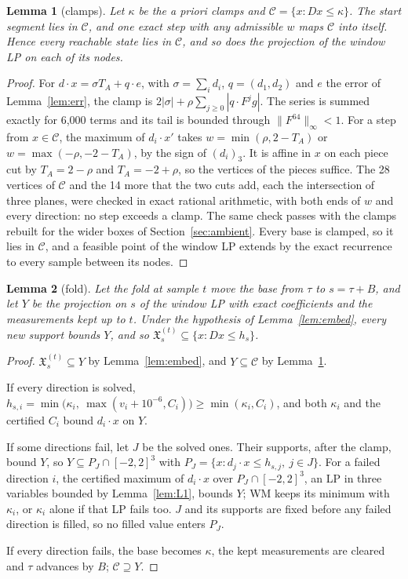 \documentclass[11pt,a4paper]{article}
\newtheorem{alemma}{Lemma}[section]
\begin{document}
\begin{alemma}[clamps]\label{lem:clamp}
Let $\kappa$ be the a priori clamps and $\mathcal{C} = \{x : Dx\le\kappa\}$. The start segment lies in $\mathcal{C}$,
and one exact step with any admissible $w$ maps $\mathcal{C}$ into itself. Hence every reachable state lies in
$\mathcal{C}$, and so does the projection of the window LP on each of its nodes.
\end{alemma}
\begin{proof}
For $d\cdot x = \sigma T_A + q\cdot e$, with $\sigma = \sum_i d_i$, $q = (d_1, d_2)$ and $e$ the error of
Lemma~\ref{lem:err}, the clamp is $2|\sigma| + \rho\sum_{j\ge0}|q\cdot F^j g|$. The series is summed exactly for 6,000
terms and its tail is bounded through $\|F^{64}\|_\infty<1$. For a step from $x\in\mathcal{C}$, the maximum of
$d_i\cdot x'$ takes $w = \min(\rho, 2 - T_A)$ or $w = \max(-\rho, -2 - T_A)$, by the sign of $(d_i)_3$. It is affine in
$x$ on each piece cut by $T_A = 2-\rho$ and $T_A = -2+\rho$, so the vertices of the pieces suffice. The 28 vertices of
$\mathcal{C}$ and the 14 more that the two cuts add, each the intersection of three planes, were checked in exact
rational arithmetic, with both ends
of $w$ and every direction: no step exceeds a clamp. The same check passes with the clamps rebuilt for the wider
boxes of Section~\ref{sec:ambient}. Every base is clamped, so it lies in $\mathcal{C}$, and a feasible
point of the window LP extends by the exact recurrence to every sample between its nodes.
\end{proof}

\begin{alemma}[fold]\label{lem:fold}
Let the fold at sample $t$ move the base from $\tau$ to $s = \tau + B$, and let $Y$ be the projection on $s$ of the
window LP with exact coefficients and the measurements kept up to $t$. Under the hypothesis of Lemma~\ref{lem:embed},
every new support bounds $Y$, and so $\mathfrak{X}^{(t)}_s\subseteq\{x : Dx\le h_s\}$.
\end{alemma}
\begin{proof}
$\mathfrak{X}^{(t)}_s\subseteq Y$ by Lemma~\ref{lem:embed}, and $Y\subseteq\mathcal{C}$ by Lemma~\ref{lem:clamp}.

If every direction is solved, $h_{s,i} = \min\bigl(\kappa_i,\ \max(v_i + 10^{-6}, C_i)\bigr)\ge\min(\kappa_i, C_i)$,
and both $\kappa_i$ and the certified $C_i$ bound $d_i\cdot x$ on $Y$.

If some directions fail, let $J$ be the solved ones. Their supports, after the clamp, bound $Y$, so
$Y\subseteq P_J\cap[-2,2]^3$ with $P_J = \{x : d_j\cdot x\le h_{s,j},\ j\in J\}$. For a failed direction $i$, the
certified maximum of $d_i\cdot x$ over $P_J\cap[-2,2]^3$, an LP in three variables bounded by Lemma~\ref{lem:L1}, bounds
$Y$; WM keeps its minimum with $\kappa_i$, or $\kappa_i$ alone if that LP fails too. $J$ and its supports are fixed
before any failed direction is filled, so no filled value enters $P_J$.

If every direction fails, the base becomes $\kappa$, the kept measurements are cleared and $\tau$ advances by $B$;
$\mathcal{C}\supseteq Y$.
\end{proof}
\end{document}
